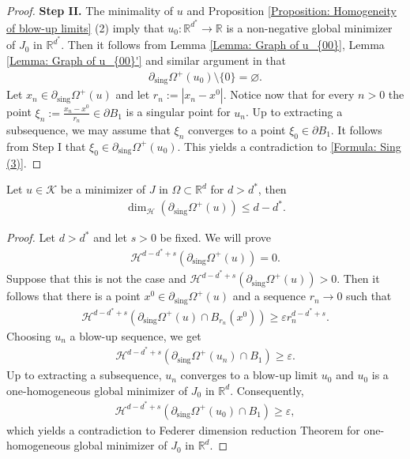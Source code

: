 \documentclass[11pt,reqno]{amsart}
\begin{document}
\begin{proof}
	\textbf{Step II.} The minimality of $u$ and Proposition \ref{Proposition: Homogeneity of blow-up limits} (2) imply that $u_{0}\colon\mathbb{R}^{d^{*}}\to\mathbb{R}$ is a non-negative global minimizer of $J_{0}$ in $\mathbb{R}^{d^{*}}$. Then it follows from Lemma \ref{Lemma: Graph of u_{00}}, Lemma \ref{Lemma: Graph of u_{00}'} and similar argument in \cite{W1999} that
	\begin{align}\label{Formula: Sing (3)}
		\partial_{\mathrm{sing}}\varOmega^{+}(u_{0})\setminus\{0\}=\varnothing.
	\end{align}
	Let $x_{n}\in\partial_{\mathrm{sing}}\varOmega^{+}(u)$ and let  $r_{n}:=|x_{n}-x^{0}|$. Notice now that for every $n>0$ the point $\xi_{n}:=\frac{x_{n}-x^{0}}{r_{n}}\in\partial B_{1}$ is a singular point for $u_{n}$. Up to extracting a subsequence, we may assume that $\xi_{n}$ converges to a point $\xi_{0}\in\partial B_{1}$. It follows from Step I that $\xi_{0}\in\partial_{\mathrm{sing}}\varOmega^{+}(u_{0})$. This yields a contradiction to \eqref{Formula: Sing (3)}.
\end{proof}
\begin{proposition}\label{Proposition: d>d*}
	Let $u\in\mathcal{K}$ be a minimizer of $J$ in $\Omega\subset\mathbb{R}^{d}$ for $d>d^{*}$, then 
	\begin{align}\label{Formula: Sing (4)}
		\dim_{\mathcal{H}}(\partial_{\mathrm{sing}}\varOmega^{+}(u))\leqslant d-d^{*}.
	\end{align} 
\end{proposition}
\begin{proof}
	Let $d>d^{*}$ and let $s>0$ be fixed. We will prove
	\begin{align}\label{Formula: Sing (5)}
		\mathcal{H}^{d-d^{*}+s}(\partial_{\mathrm{sing}}\varOmega^{+}(u))=0.
	\end{align}
	Suppose that this is not the case and $\mathcal{H}^{d-d^{*}+s}(\partial_{\mathrm{sing}}\varOmega^{+}(u))>0$. Then it follows that there is a point $x^{0}\in\partial_{\mathrm{sing}}\varOmega^{+}(u)$ and a sequence $r_{n}\to0$ such that
	\begin{align*}
		\mathcal{H}^{d-d^{*}+s}(\partial_{\mathrm{sing}}\varOmega^{+}(u)\cap B_{r_{n}}(x^{0}))\geqslant\varepsilon r_{n}^{d-d^{*}+s}.
	\end{align*} 
	Choosing $u_{n}$ a blow-up sequence, we get
	\begin{align*}
		\mathcal{H}^{d-d^{*}+s}(\partial_{\mathrm{sing}}\varOmega^{+}(u_{n})\cap B_{1})\geqslant\varepsilon.
	\end{align*}
	Up to extracting a subsequence, $u_{n}$ converges to a blow-up limit $u_{0}$ and $u_{0}$ is a one-homogeneous global minimizer of $J_{0}$ in $\mathbb{R}^{d}$. Consequently,
	\begin{align*}
		\mathcal{H}^{d-d^{*}+s}(\partial_{\mathrm{sing}}\varOmega^{+}(u_{0})\cap B_{1})\geqslant\varepsilon,
	\end{align*}
	which yields a contradiction to Federer dimension reduction Theorem \cite{F1996} for one-homogeneous global minimizer of $J_{0}$ in $\mathbb{R}^{d}$.
\end{proof}
\end{document}
